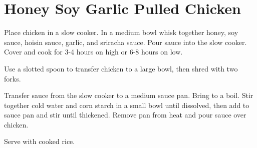 \section{Honey Soy Garlic Pulled Chicken}
\begin{recipe}




Place chicken in a slow cooker. In a medium bowl whisk together honey, soy sauce, hoisin sauce, garlic, and sriracha sauce. Pour sauce into the slow cooker. Cover and cook for 3-4 hours on high or 6-8 hours on low.


Use a slotted spoon to transfer chicken to a large bowl, then shred with two forks.

Transfer sauce from the slow cooker to a medium sauce pan. Bring to a boil. Stir together cold water and corn starch in a small bowl until dissolved, then add to sauce pan and stir until thickened. Remove pan from heat and pour sauce over chicken.

Serve with cooked rice.

\end{recipe}
